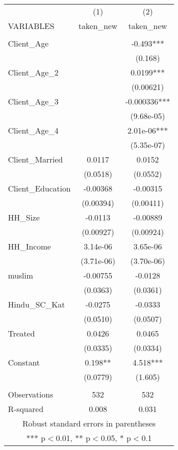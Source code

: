 \begin{tabular}{lcc} \hline
 & (1) & (2) \\
VARIABLES & taken\_new & taken\_new \\ \hline
 &  &  \\
Client\_Age &  & -0.493*** \\
 &  & (0.168) \\
Client\_Age\_2 &  & 0.0199*** \\
 &  & (0.00621) \\
Client\_Age\_3 &  & -0.000336*** \\
 &  & (9.68e-05) \\
Client\_Age\_4 &  & 2.01e-06*** \\
 &  & (5.35e-07) \\
Client\_Married & 0.0117 & 0.0152 \\
 & (0.0518) & (0.0552) \\
Client\_Education & -0.00368 & -0.00315 \\
 & (0.00394) & (0.00411) \\
HH\_Size & -0.0113 & -0.00889 \\
 & (0.00927) & (0.00924) \\
HH\_Income & 3.14e-06 & 3.65e-06 \\
 & (3.71e-06) & (3.70e-06) \\
muslim & -0.00755 & -0.0128 \\
 & (0.0363) & (0.0361) \\
Hindu\_SC\_Kat & -0.0275 & -0.0333 \\
 & (0.0510) & (0.0507) \\
Treated & 0.0426 & 0.0465 \\
 & (0.0335) & (0.0334) \\
Constant & 0.198** & 4.518*** \\
 & (0.0779) & (1.605) \\
 &  &  \\
Observations & 532 & 532 \\
 R-squared & 0.008 & 0.031 \\ \hline
\multicolumn{3}{c}{ Robust standard errors in parentheses} \\
\multicolumn{3}{c}{ *** p$<$0.01, ** p$<$0.05, * p$<$0.1} \\
\end{tabular}
